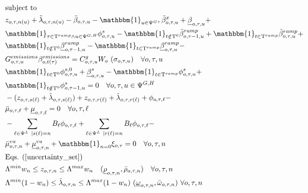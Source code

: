 \documentclass[final]{IEEEtran}
\newcommand{\Tau}{\mathrm{T}}
\begin{document}
\begin{align}
&\text{subject to} \nonumber \\
&\label{subproblem_constr_first}z_{o, \tau, n(u)} + \tilde{\lambda}_{o, \tau, n(u)} - \bar{\beta}_{o, \tau, u} - \mathbbm{1}_{u \in \Psi^{G+}} \bar{\beta}^x_{o, \tau, u} + \underline{\beta}_{o, \tau, u} + \nonumber \\
&\mathbbm{1}_{\tau \in \Tau^{ramp} \land u \in \Psi^{G, H}} \phi_{o, \tau, u}^{s} - \mathbbm{1}_{t \notin \Tau^0} \bar{\beta}_{o, \tau - 1, u}^{ramp} + \mathbbm{1}_{t \in \Tau^{ramp}} \bar{\beta}_{o, \tau, u}^{ramp} + \nonumber \\
&\mathbbm{1}_{t \notin \Tau^0} \underline{\beta}_{o, \tau - 1, u}^{ramp} - \mathbbm{1}_{t \in \Tau^{ramp}} \underline{\beta}_{o, \tau, u}^{ramp} - \nonumber \\
&G_{o, \tau, u}^{emissions} \beta_{o, t(\tau)}^{emissions} = C^g_{o, \tau, u}  W_o \, \, (\sigma_{o, \tau, u}) \quad \forall o, \tau, u \\
&\mathbbm{1}_{t \in \Tau^0} \phi_{o, \tau, u}^{s,0} + \underline{\beta}_{o, \tau, u}^s - \mathbbm{1}_{t \in \Tau^{ramp}} \phi_{o, \tau, u}^{s} + \nonumber \\
&\mathbbm{1}_{t \notin \Tau^0} \phi_{o, \tau - 1, u}^{s} = 0 \quad \forall o, \tau, u \in \Psi^{G, H} \\
&-(z_{o, \tau, s(\ell)} + \tilde{\lambda}_{o, \tau, s(\ell)}) + z_{o, \tau, r(\ell)} + \tilde{\lambda}_{o, \tau, r(\ell)} + \phi_{o, \tau, \ell} - \nonumber \\
&\bar{\mu}_{o, \tau, \ell} + \underline{\mu}_{o, \tau, \ell} = 0 \quad \forall o, \tau, \ell \\
&-\sum\limits_{\ell \in \Psi^L | s(\ell) = n} B_\ell \phi_{o, \tau, \ell} + \sum\limits_{\ell \in \Psi^L | r(\ell) = n} B_\ell \phi_{o, \tau, \ell} - \nonumber \\
&\label{subproblem_constr_last_in_slave}\bar{\mu}^{va}_{o, \tau, n} + \underline{\mu}^{va}_{o, \tau, n} + \mathbbm{1}_{n = 0} \xi_{o, \tau} = 0 \quad \forall o, \tau, n \\
&\text{Eqs. } (\ref{uncertainty_set}) \\
&\Lambda^{min} w_n \leq z_{o, \tau, n} \leq \Lambda^{max} w_n \quad (\underline{\rho}_{o, \tau, n}, \bar{\rho}_{o, \tau, n}) \quad \forall o,\tau,n \\
&\label{subproblem_last}\Lambda^{min} (1 - w_n) \leq \tilde{\lambda}_{o, \tau, n} \leq \Lambda^{max} (1 - w_n) \, \, (\underline{\omega}_{o, \tau, n}, \bar{\omega}_{o, \tau, n}) \, \, \forall o,\tau,n
\end{align}
\end{document}
